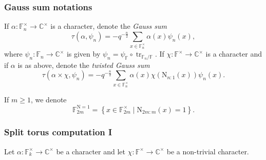 \documentclass[12pt, reqno]{amsart}
\theoremstyle{definition}
\theoremstyle{definition}
\theoremstyle{definition}
\newcommand{\cComplex}{\mathbb{C}}
\newcommand{\multiplicativegroup}[1]{#1^{\times}}
\newcommand{\fieldCharacter}{\psi}
\newcommand{\trace}{\operatorname{tr}}
\newcommand{\FieldNorm}[2]{\mathrm{N}_{#1:#2}}
\newcommand{\aFieldNorm}{\mathrm{N}}
\newcommand{\finiteField}{\mathbb{F}}
\newcommand{\finiteFieldExtension}[1]{\finiteField_{#1}}
\newcommand{\NormOneGroup}[1]{\finiteFieldExtension{#1}^{\aFieldNorm = 1}}
\begin{document}
\subsubsection{Gauss sum notations}
If $\alpha \colon \multiplicativegroup{\finiteFieldExtension{n}} \to \multiplicativegroup{\cComplex}$ is a character, denote the \emph{Gauss sum} $$\tau\left(\alpha, \fieldCharacter_n\right) = -q^{-\frac{n}{2}}\sum_{x \in \multiplicativegroup{\finiteFieldExtension{n}}} \alpha\left(x\right) \fieldCharacter_n\left(x\right),$$
where $\fieldCharacter_n \colon \finiteFieldExtension{n} \to \multiplicativegroup{\cComplex}$ is given by $\fieldCharacter_n = \fieldCharacter_{\finiteField} \circ \trace_{\finiteFieldExtension{n} \slash \finiteField}$. If $\chi \colon \multiplicativegroup{\finiteField} \to \multiplicativegroup{\cComplex}$ is a character and if $\alpha$ is as above, denote the \emph{twisted Gauss sum}
$$\tau\left(\alpha \times \chi, \fieldCharacter_n\right) = -q^{-\frac{n}{2}}\sum_{x \in \multiplicativegroup{\finiteFieldExtension{n}}} \alpha\left(x\right) \chi\left( \FieldNorm{n}{1}\left(x\right)\right) \fieldCharacter_n\left(x\right).$$

If $m \ge 1$, we denote 
$$\NormOneGroup{2m} = \left\{ x \in \multiplicativegroup{\finiteFieldExtension{2m}} \mid \FieldNorm{2m}{m}\left(x\right)= 1\right\}.$$

\subsubsection{Split torus computation I}
Let $\alpha \colon \multiplicativegroup{\finiteFieldExtension{k}} \to \multiplicativegroup{\cComplex}$ be a character and let $\chi \colon \multiplicativegroup{\finiteField} \to \multiplicativegroup{\cComplex}$ be a non-trivial character.
\end{document}
